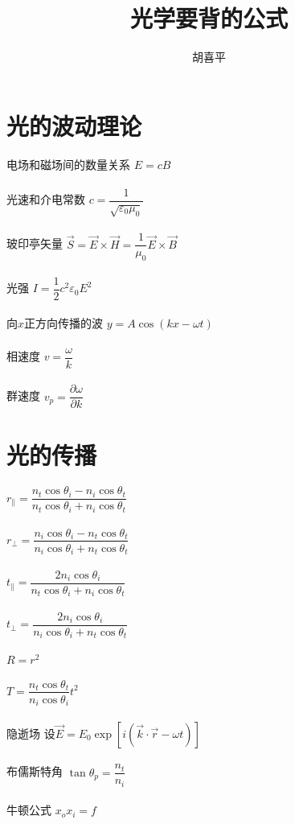 \documentclass{article}
\author{胡喜平}
\affil{https://hxp.plus/}
\title{光学要背的公式}
\begin{document}
\maketitle

\begin{multicols}{2}

\section{光的波动理论}

电场和磁场间的数量关系 $E = c B$
\\\\
光速和介电常数 $c = \dfrac{1}{\sqrt{\varepsilon_0 \mu_0}} $
\\\\
玻印亭矢量 $\vec{S} = \vec{E} \times \vec{H} = \dfrac{1}{\mu_0} \vec{E} \times \vec{B} $
\\\\
光强 $I = \dfrac{1}{2} c^2 \varepsilon_0 E^2 $
\\\\
向$x$正方向传播的波 $y = A \cos \left( k x - \omega t \right)$
\\\\
相速度 $v = \dfrac{\omega}{k} $
\\\\
群速度 $v_p = \dfrac{\partial \omega}{\partial k} $

\section{光的传播}

$r_{\parallel} = \dfrac{n_t \cos \theta_i - n_i \cos \theta_t}{n_t \cos \theta_i + n_i \cos \theta_t} $
\\\\
$r_{\perp} = \dfrac{n_i \cos \theta_i - n_t \cos \theta_t}{n_i \cos \theta_i + n_t \cos \theta_t} $
\\\\
$t_{\parallel} = \dfrac{2 n_i \cos \theta_i}{n_t \cos \theta_i + n_i \cos \theta_t} $
\\\\
$t_{\perp} = \dfrac{2 n_i \cos \theta_i }{n_i \cos \theta_i + n_t \cos \theta_t} $
\\\\
$R = r^2$
\\\\
$T = \dfrac{n_t \cos \theta_t}{n_i \cos \theta_i} t^2 $
\\\\
隐逝场 设$\vec{E} = E_0 \exp \left[ i \left( \vec{k} \cdot \vec{r} - \omega t \right) \right]$
\\\\
布儒斯特角 $\tan \theta_p = \dfrac{n_t}{n_i} $
\\\\
牛顿公式 $x_o x_i = f$


\end{multicols}
\end{document}
